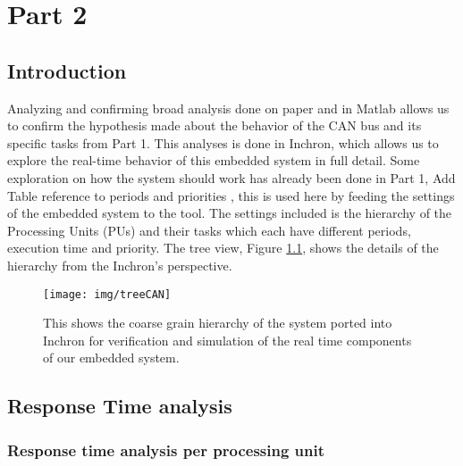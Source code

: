\chapter{Part 2}


\section{Introduction}

Analyzing and confirming broad analysis done on paper and in Matlab allows us to confirm the hypothesis made about the behavior of the CAN bus and its specific tasks from Part 1. This analyses is done in Inchron, which allows us to explore the real-time behavior of this embedded system in full detail. Some exploration on how the system should work has already been done in Part 1, \color{red} Add Table reference to periods and priorities \color{black}, this is used here by feeding the settings of the embedded system to the tool. The settings included is the hierarchy of the Processing Units (PUs) and their tasks which each have different periods, execution time and priority. The tree view, Figure \ref{fig:treeCAN}, shows the details of the hierarchy from the Inchron's perspective.

\begin{figure}[h!]
	\begin{center}
		\texttt{[image: img/treeCAN]}
		\caption{This shows the coarse grain hierarchy of the system ported into Inchron for verification and simulation of the real time components of our embedded system.}
		\label{fig:treeCAN}
	\end{center}
\end{figure}




\section{Response Time analysis}

\subsection{Response time analysis per processing unit}

